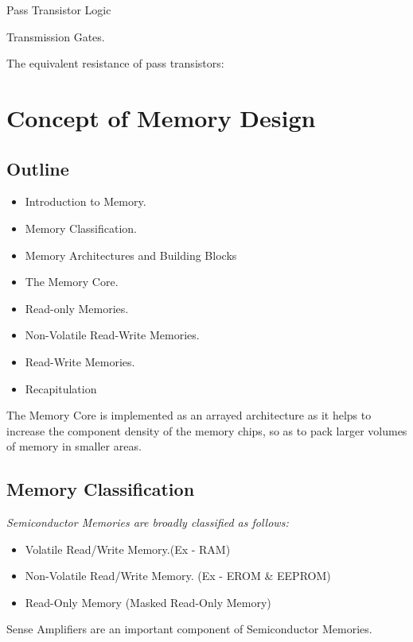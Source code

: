 \documentclass[12pt, letterpaper]{article}
\begin{document}
 








							Pass Transistor Logic


Transmission Gates.


The equivalent resistance of pass transistors:





\section{Concept of Memory Design}

\subsection{Outline}
\begin{itemize}
    \item Introduction to Memory.
    \item Memory Classification.
    \item Memory Architectures and Building Blocks
    \item The Memory Core.
    \item	Read-only Memories.
    \item	Non-Volatile Read-Write Memories.
    \item Read-Write Memories.
    \item Recapitulation
\end{itemize}

The Memory Core is implemented as an arrayed architecture as it helps to increase the component density of the memory chips, so as to pack larger volumes of memory in smaller areas. 
\subsection{Memory Classification}
\emph{Semiconductor Memories are broadly classified as follows:}
\begin{itemize}
    \item  Volatile Read/Write Memory.(Ex - RAM)
    \item Non-Volatile Read/Write Memory. (Ex - EROM \& EEPROM)
    \item Read-Only Memory (Masked Read-Only Memory)
\end{itemize}

Sense Amplifiers are an important component of Semiconductor Memories.
\end{document}
